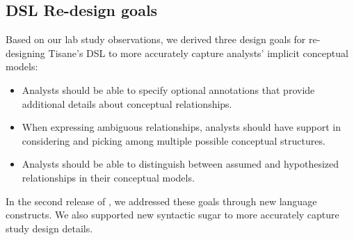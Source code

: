 \subsection{DSL Re-design goals} \label{sec:rtisane_design_implications} 

Based on our lab study observations, we derived three design goals for
re-designing Tisane's DSL to more accurately capture analysts' implicit
conceptual models: 
\begin{itemize}
    \item Analysts should be able to specify optional annotations that provide
    additional details about conceptual relationships.
    \item When expressing ambiguous relationships, analysts should have support
    in considering and picking among multiple possible conceptual structures.
    \item Analysts should be able to distinguish between assumed and hypothesized relationships in their conceptual models. 
\end{itemize}

In the second release of \tisane, we addressed these goals through new language
constructs. We also supported new syntactic sugar to more accurately capture
study design details. 

